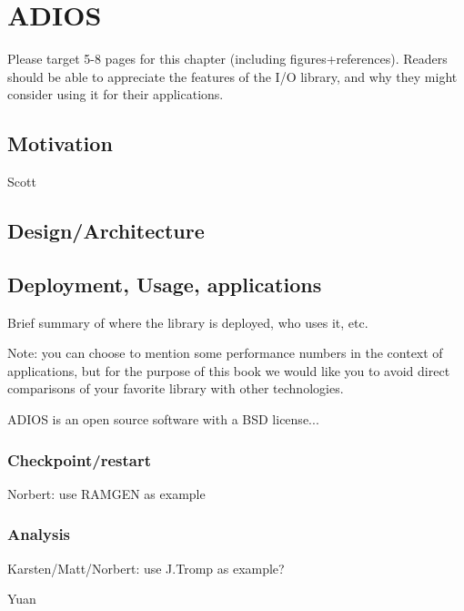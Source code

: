 
\chapter{ADIOS}
\label{part3-ch5-adios}
{\color {red}Please target 5-8 pages for this chapter (including figures+references). Readers should be able to appreciate the features of the I/O library, and why they might consider using it for their applications.}


\section{Motivation}
{\color {red}Scott}




\section{Design/Architecture}




\section{Deployment, Usage, applications}
{\color {red}Brief summary of where the library is deployed, who uses it, etc.

Note: you can choose to mention some performance numbers in the context of applications, but for the purpose of this book we would like you to avoid direct comparisons of your favorite library with other technologies.  }

ADIOS is an open source software with a BSD license...


\subsection{Checkpoint/restart}
{\color {red}Norbert: use RAMGEN as example}



\subsection{Analysis}
{\color {red}Karsten/Matt/Norbert: use J.Tromp as example?}

{\color {red}Yuan}



